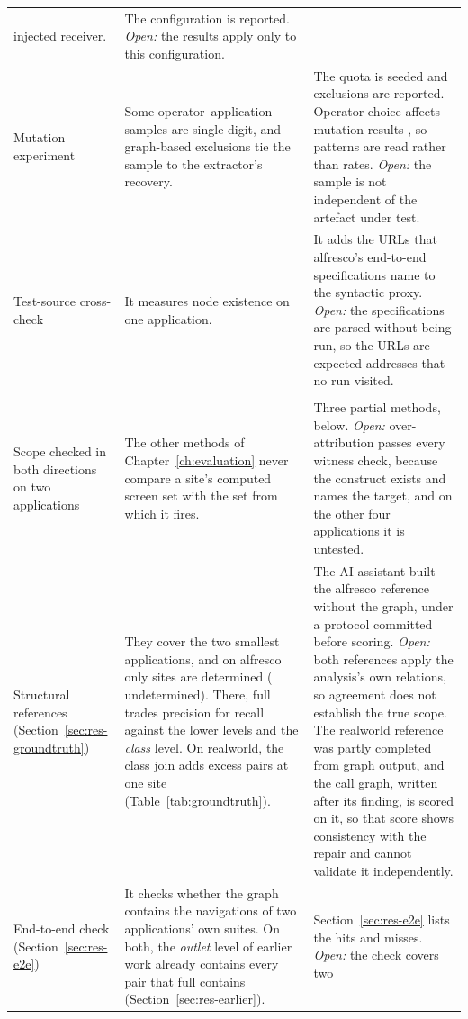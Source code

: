 \begin{xltabular}{\textwidth}{@{}>{\raggedright\arraybackslash}p{2.4cm}YY@{}}
injected receiver.
& The configuration is reported. \emph{Open:} the results apply only to this configuration. \\
Mutation experiment
& Some operator--application samples are single-digit, and graph-based exclusions tie the sample to
the extractor's recovery.
& The quota is seeded and exclusions are reported. Operator choice affects mutation results
\cite{papadakis2019mutation}, so patterns are read rather than rates. \emph{Open:} the sample is
not independent of the artefact under test. \\
Test-source cross-check
& It measures node existence on one application.
& It adds the URLs that alfresco's end-to-end specifications name to the syntactic proxy.
\emph{Open:} the specifications are parsed without being run, so the URLs are expected addresses that no
run visited. \\
\addlinespace[2pt]
\\
\addlinespace[2pt]
Scope checked in both directions on two applications
& The other methods of Chapter~\ref{ch:evaluation} never compare a site's computed screen set with
the set from which it fires.
& Three partial methods, below. \emph{Open:} over-attribution passes every witness check, because the
construct exists and names the target, and on the other four applications it is untested. \\
\quad Structural references (Section~\ref{sec:res-groundtruth})
& They cover the two smallest applications, and on alfresco only \GTAlfSites{} sites are
determined (\GTAlfUndetermined{} undetermined). There, full trades precision for recall against the
lower levels and the \emph{class} level. On realworld, the class join adds
\GTClassExcess{} excess pairs at one site (Table~\ref{tab:groundtruth}).
& The AI assistant built the alfresco reference without the graph, under a protocol committed
before scoring. \emph{Open:} both references apply the analysis's own relations, so agreement does
not establish the true scope. The realworld reference was partly completed from graph output, and
the call graph, written after its finding, is scored on it, so that score shows consistency with
the repair and cannot validate it independently. \\
\quad End-to-end check (Section~\ref{sec:res-e2e})
& It checks whether the graph contains the navigations of two applications' own suites. On both,
the \emph{outlet} level of earlier work already contains every pair that full contains
(Section~\ref{sec:res-earlier}).
& Section~\ref{sec:res-e2e} lists the hits and misses. \emph{Open:} the check covers two

\end{xltabular}
